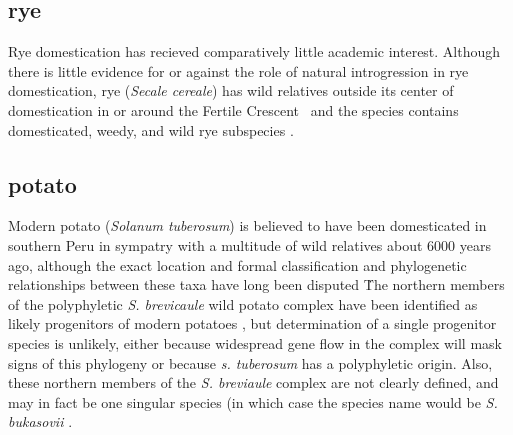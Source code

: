 \documentclass[11pt]{article}
\begin{document}
\subsection*{rye}

Rye domestication has recieved comparatively little academic interest.
Although there is little evidence for or against the role of natural introgression in rye domestication, rye (\emph{Secale cereale}) has wild relatives outside its center of domestication in or around the Fertile Crescent \cite{vavilov1928geographical}\, and the species contains domesticated, weedy, and wild rye subspecies \cite{khush1961cytogenetic}.


















\subsection*{potato}

Modern potato (\emph{Solanum tuberosum}) is believed to have been domesticated in southern Peru in sympatry with a multitude of wild relatives about 6000 years ago, although the exact location and formal classification and phylogenetic relationships between these taxa have long been disputed \cite{huaman2002reclassification, spooner2005single, pickersgill1977origins, hawkes1988evolution}\.
The northern members of the polyphyletic \emph{S. brevicaule} wild potato complex have been identified as likely progenitors of modern potatoes \cite{correll1962potato}, but determination of a single progenitor species is unlikely, either because widespread gene flow in the complex will mask signs of this phylogeny or because \emph{s. tuberosum} has a polyphyletic origin.
Also, these northern members of the \emph{S. breviaule} complex are not clearly defined, and may in fact be one singular species (in which case the species name would be \emph{S. bukasovii} \cite{spooner2005single}.
\end{document}
